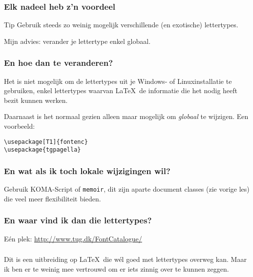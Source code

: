 \begin{frame}
  \frametitle{Elk nadeel heb z'n voordeel}

  \begin{exampleblock}{Tip}
	Gebruik steeds zo weinig mogelijk verschillende (en exotische) lettertypes.
  \end{exampleblock}

  Mijn advies: verander je lettertype enkel globaal.
\end{frame}

\begin{frame}[fragile]
  \frametitle{En hoe dan te veranderen?}

  Het is niet mogelijk om de lettertypes uit je Windows- of Linuxinstallatie te gebruiken, enkel lettertypes waarvan \LaTeX~de informatie die het nodig heeft bezit kunnen werken.

  Daarnaast is het normaal gezien alleen maar mogelijk om \emph{globaal} te wijzigen. Een voorbeeld:
\begin{verbatim}
\usepackage[T1]{fontenc}
\usepackage{tgpagella}
\end{verbatim}
\end{frame}

\begin{frame}[fragile]
  \frametitle{En wat als ik toch lokale wijzigingen wil?}

  Gebruik KOMA-Script of \texttt{memoir}, dit zijn aparte document classes (zie vorige les) die veel meer flexibiliteit bieden.
\end{frame}

\begin{frame}
  \frametitle{En waar vind ik dan die lettertypes?}

  E\'en plek: \url{http://www.tug.dk/FontCatalogue/}
\end{frame}

\begin{frame}[fragile]
  \frametitle{\XeTeX}

  Dit is een uitbreiding op \LaTeX~die w\'el goed met lettertypes overweg kan. Maar ik ben er te weinig mee vertrouwd om er iets zinnig over te kunnen zeggen.
\end{frame}
